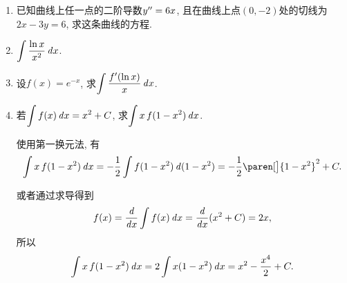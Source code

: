 \documentclass[a4paper,punct=CCT]{ctexbook}
\newcommand*{\mreason}[1]{#1}
\newcommand*{\disp}[1]{\( \displaystyle #1 \)}
\theoremstyle{definition}
\theoremstyle{remark}
\newif\ifshowsol
\begin{document}
\begin{enumerate}
\item 已知曲线上任一点的二阶导数\(y'' = 6x\), 且在曲线上点\((0, -2)\)处的切线为\(2x - 3y = 6\), 求这条曲线的方程.

  \ifshowsol
  将切线的方程化为点斜式, 得到\(y = 2x/3 - 2\), 所以\(y'\big\vert_{x=0} = 2/3\)．有
  \[
    y' = \int y\dpr \dx = \int 6x \dx = 3x^2 + c_1,
  \]
  所以\(c_1 = 2/3\). 又有
  \[
    y = \int y' \dx = \int \paren[\Big]{3x^2 + \frac23} \dx = x^3 + \frac23 x + c_2,
  \]
  所以\(c_2 = -2\)．这条曲线的方程是
  \[
    y = x^3 + \frac23 x - 2.
  \]
  \fi

\item \disp{\int \frac{\ln x}{x^2} \dx}.

  \ifshowsol
  最好的办法是用\(x = e^t\)换元后用分部积分法, 可惜这里还没学到．有
  \begin{align*}
    \int \frac{\ln x}{x^2} \dx
    &= \int t e^{-t} \dt
    && \mreason{x = e^t} \\
    &= - \int t \diff e^{-t} \\
    &= - \paren[\Big]{t e^{-t} - \int e^{-t} \dt} \\
    &= - t e^{-t} - e^{-t} + C \\
    &= - \frac{\ln x}{x} - \frac1x + C.
  \end{align*}
  \fi

\item 设\(f(x) = e^{-x}\), 求\disp{\int \frac{f'(\ln x)}{x} \dx}.

  \ifshowsol
  使用第一换元法, 有
  \begin{equation*}
    \int \frac{f'(\ln x)}{x} \dx
    = \int f'(\ln x) \diff (\ln x)
    = f(\ln x) = \frac1x + C.
  \end{equation*}

  也可以直接求导\(f'(x) = - e^{-x}\), 然后直接代入, 有
  \begin{equation*}
    \int \frac{f'(\ln x)}{x} \dx
    = - \int \frac{1}{x^2} \dx
    = \frac1x + C.
  \end{equation*}
  \fi

\item 若\disp{\int f(x) \dx = x^2 + C}, 求\disp{\int x \, f(1-x^2) \dx}.

  \ifshowsol
  使用第一换元法, 有
  \begin{align*}
    \int x \, f(1-x^2) \dx
    = - \frac12 \int f(1-x^2) \diff (1-x^2)
    = - \frac12 \paren[\big]{1-x^2}^2 + C.
  \end{align*}

  或者通过求导得到
  \[
    f(x) = \frac{\mathop{}\!\mathit{d}}{\mathop{}\!\mathit{d} x} \int f(x) \mathop{}\!\mathit{d} x = \frac{\mathop{}\!\mathit{d}}{\mathop{}\!\mathit{d} x} (x^2 + C) = 2x,
  \]
  所以
  \[
    \int x \, f(1-x^2) \mathop{}\!\mathit{d} x
    = 2 \int x (1-x^2) \mathop{}\!\mathit{d} x
    = x^2 - \frac{x^4}{2} + C.
  \]


\end{enumerate}
\end{document}
